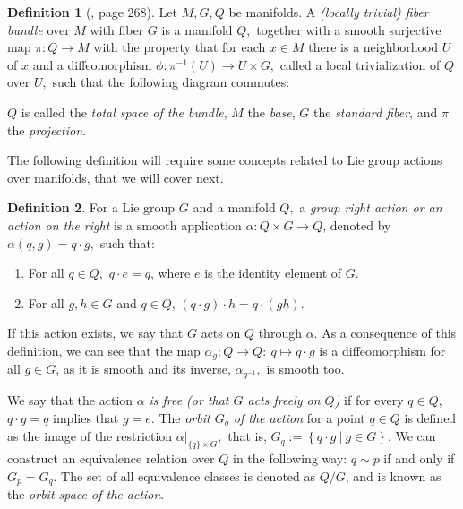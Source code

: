 \documentclass[12pt, letterpaper, reqno]{amsart}
\theoremstyle{definition}
\newtheorem{df}{Definition}
\theoremstyle{plain}
\theoremstyle{remark}
\begin{document}
\begin{df}[\cite{lee2003introduction}, page 268]
	Let $ M, G, Q $ be manifolds. A \textit{(locally trivial) fiber bundle} over $ M $ with fiber $ G $ is a manifold $ Q, $ together with a smooth surjective map $ \pi: Q \rightarrow {M}
$ with the property that for each $ x\in M $ there is a neighborhood $ U $ of $ x $ and a diffeomorphism $ \phi:\pi^{-1}(U) \rightarrow {U\times G,}
 $ called a local trivialization of $ Q $ over $ U, $ such that the following diagram commutes:
 \begin{center}
 \end{center}
 $ Q $ is called the \textit{total space of the bundle}, $ M $ the \textit{base}, $ G $ the \textit{standard fiber},  and $ \pi $ the \textit{projection}.   
\end{df}

The following definition will require some concepts related to Lie group actions over manifolds, that we will cover next. 

\begin{df}
For a Lie group $ G $ and a manifold $ Q, $ a \textit{group right action or an action on the right} is a smooth application $ \alpha:  Q\times G \rightarrow Q $, denoted by $ \alpha(q,g) = q \cdot g, $ such that:

\begin{enumerate}
	\item For all $ q\in Q, $ $ q\cdot e = q $, where $ e $ is the identity element of $ G. $   
	\item For all $ g,h\in G $ and $ q\in Q $, $ (q\cdot g) \cdot h =q\cdot(gh). $ 
\end{enumerate}

\end{df}
If this action exists, we say that $ G $ acts on $ Q $ through $ \alpha. $ As a consequence of this definition, we can see that the map $ \alpha_g: Q \rightarrow Q: \ q\mapsto q\cdot g$ is a diffeomorphism for all $ g\in G $, as it is smooth and its inverse, $ \alpha_{g^{-1}}, $ is smooth too.

We say that the action $ \alpha $ \textit{is free (or that $ G $ acts freely on $ Q $)} if for every $ q\in Q $, $ q\cdot g =q$   implies that $ g=e. $ The \textit{orbit $ G_q $ of the action}  for a point $ q\in Q $  is defined as the image of the restriction $\alpha|_{\{q\}\times G},$  that is, $ G_q := \left\{q\cdot g \ | \ g\in G \right\}. $ We can construct an equivalence relation over $ Q $ in the following way: $ q\sim p $ if and only if $ G_p = G_q $. The set of all equivalence classes is denoted as $ Q/G $, and is known as the \textit{orbit space of the action}.     
\end{document}
